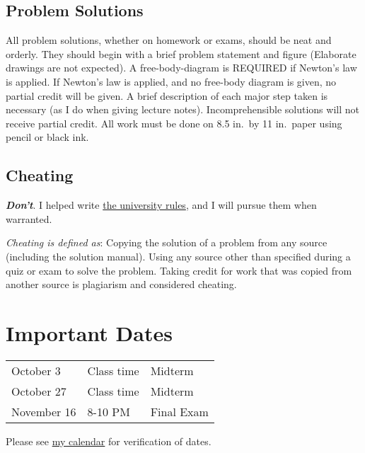 \documentclass[10pt]{article}
\begin{document}
\subsection{Problem Solutions} All problem solutions, whether on homework or exams, should be neat and orderly.  They should begin with a brief problem statement and figure (Elaborate drawings are not expected).  A free-body-diagram is REQUIRED if Newton's law is applied.  If Newton's law is applied, and no free-body diagram is given, no partial credit will be given.  A brief description of each major step taken is necessary (as I do when giving lecture notes).  Incomprehensible solutions will not receive partial credit.  All work must be done on 8.5 in.~by 11 in.~paper using pencil or black ink.


\subsection*{Cheating}
\emph{\textbf{Don't}}. I helped write \href{http://www.wright.edu/students/judicial/integrity.html}{the university rules}, and I will pursue them when warranted. 

\emph{Cheating is defined as}: Copying the solution of a problem from any source (including the solution manual). Using any source other than specified during a quiz or exam to solve the problem.  Taking credit for work that was copied from another source is plagiarism and considered cheating. 

\section{Important Dates}

\begin{tabular}{lll}
       October 3&Class time &Midterm \\
       October 27&Class time &Midterm \\
       November 16& 8-10 PM & Final Exam 
\end{tabular}

\noindent Please see \href{http://www.cs.wright.edu/~jslater/calendar.shtml}{my calendar} for verification of dates.
\end{document}
